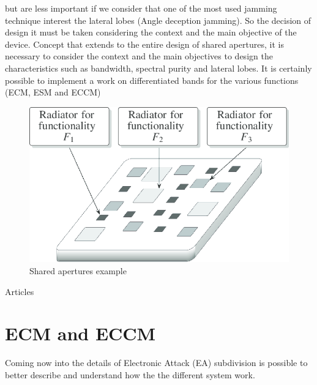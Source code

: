 \documentclass[12pt]{report}
\begin{document}
but are less important if we consider that one of the most used jamming technique interest the lateral lobes (Angle deception jamming). So the decision of design it must be taken considering the context and the main objective of the device. Concept that extends to the entire design of shared apertures, it is necessary to consider the context and the main objectives to design the characteristics such as bandwidth, spectral purity and lateral lobes. It is certainly possible to implement a work on differentiated bands for the various functions (ECM, ESM and ECCM)

\begin{figure}[h!]
    \centering
    \includegraphics[width=12cm]{Pictures/Illustrative-for-the-shared-aperture-antenna-concept-different-sets-of-radiators.png}
    \caption{Shared apertures example}
\end{figure}



Articles \cite{ewsys} \cite{radarsys} \cite{wiki:ew}

\chapter{ECM and ECCM} \label{Electronic Attack}
Coming now into the details of Electronic Attack (EA) subdivision is possible to better describe and understand how the the different system work.
\end{document}
